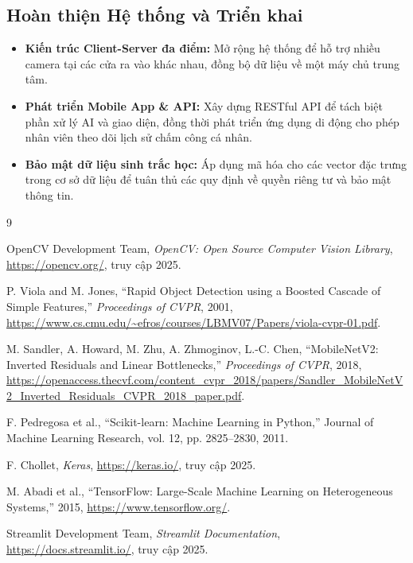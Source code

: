 \documentclass[a4paper]{book}
\begin{document}
\subsection*{Hoàn thiện Hệ thống và Triển khai}
\begin{itemize}
    \item \textbf{Kiến trúc Client-Server đa điểm:} Mở rộng hệ thống để hỗ trợ nhiều camera tại các cửa ra vào khác nhau, đồng bộ dữ liệu về một máy chủ trung tâm.
    \item \textbf{Phát triển Mobile App \& API:} Xây dựng RESTful API để tách biệt phần xử lý AI và giao diện, đồng thời phát triển ứng dụng di động cho phép nhân viên theo dõi lịch sử chấm công cá nhân.
    \item \textbf{Bảo mật dữ liệu sinh trắc học:} Áp dụng mã hóa cho các vector đặc trưng trong cơ sở dữ liệu để tuân thủ các quy định về quyền riêng tư và bảo mật thông tin.
\end{itemize}


\begin{thebibliography}{9}

 OpenCV Development Team, \emph{OpenCV: Open Source Computer Vision Library}, \url{https://opencv.org/}, truy cập 2025.

 P. Viola and M. Jones, ``Rapid Object Detection using a Boosted Cascade of Simple Features,'' \emph{Proceedings of CVPR}, 2001, \url{https://www.cs.cmu.edu/~efros/courses/LBMV07/Papers/viola-cvpr-01.pdf}.

 M. Sandler, A. Howard, M. Zhu, A. Zhmoginov, L.-C. Chen, ``MobileNetV2: Inverted Residuals and Linear Bottlenecks,'' \emph{Proceedings of CVPR}, 2018, \url{https://openaccess.thecvf.com/content_cvpr_2018/papers/Sandler_MobileNetV2_Inverted_Residuals_CVPR_2018_paper.pdf}.

F. Pedregosa et al., “Scikit-learn: Machine Learning in Python,” Journal of Machine Learning Research, vol. 12, pp. 2825–2830, 2011.

 F. Chollet, \emph{Keras}, \url{https://keras.io/}, truy cập 2025.

 M. Abadi et al., ``TensorFlow: Large-Scale Machine Learning on Heterogeneous Systems,'' 2015, \url{https://www.tensorflow.org/}.

 Streamlit Development Team, \emph{Streamlit Documentation}, \url{https://docs.streamlit.io/}, truy cập 2025.

\end{thebibliography}
\end{document}
